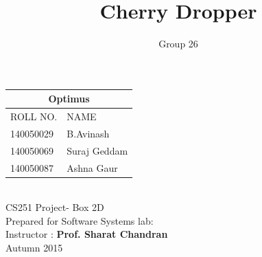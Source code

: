 \documentclass{article}
\title{\Huge Cherry Dropper}
\author{\huge Group 26}
\begin{document}
\maketitle
\begin{center}
\setlength{\arrayrulewidth}{1mm}
\setlength{\tabcolsep}{18pt}
\renewcommand{\arraystretch}{2.5}
 
{
\begin{tabular}{ |p{3cm}|p{3cm}|  }
\hline
\multicolumn{2}{|c|}{\huge Optimus} \\
\hline
 ROLL NO.  & NAME\\
\hline
 140050029 & B.Avinash \\
 140050069   & Suraj Geddam \\
 140050087 & Ashna Gaur \\
\hline
\end{tabular}
}
\\[5\baselineskip]
{\huge CS251 Project- Box 2D}
\\[2\baselineskip]
Prepared for Software Systems lab: \\[1\baselineskip]
{\large Instructor} : \textbf{Prof. Sharat Chandran }\\[1\baselineskip]
Autumn 2015 \\
\end{center}

\newpage
\end{document}
